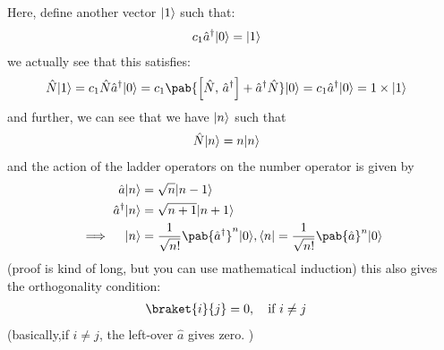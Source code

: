 Here, define another vector $\lvert1\rangle$ such that:
\begin{align}
  c_1 \hat{a}^{\dagger} \lvert0\rangle & = \lvert1\rangle
\end{align}
we actually see that this satisfies:
\begin{align}
  \hat{N} \ket{1} & = c_1 \hat{N} \hat{a}^\dagger \ket{0} = c_1 \pab{\commt{\hat{N}}{\hat{a}^\dagger} + \hat{a}^\dagger \hat{N}} \ket{0} = c_1 \hat{a}^\dagger \ket{0} = 1 \times \ket{1}
\end{align}
and further, we can see that we have $\lvert n\rangle$ such that
\begin{align}
  \hat{N} \lvert n\rangle & = n \lvert n\rangle
\end{align}
and the action of the ladder operators on the number operator is given by
\begin{align}
  \hat{a} \ket{n}           & = \sqrt{n} \ket{n - 1}                                                                                         \\
  \hat{a}^{\dagger} \ket{n} & = \sqrt{n + 1} \ket{n + 1}                                                                                     \\
  \implies \quad \ket{n}    & = \frac{1}{\sqrt{n!}} \pab{\hat{a}^{\dagger}}^n \ket{0}, \bra{n} = \frac{1}{\sqrt{n!}} \pab{\hat{a}}^n \ket{0}
\end{align}
(proof is kind of long, but you can use mathematical induction)
this also gives the orthogonality condition:
\begin{align}
  \braket{i}{j} & = 0, \quad \text{if } i \neq j
\end{align}
(basically,if $i \neq j$, the left-over $\hat{a}$ gives zero. )

